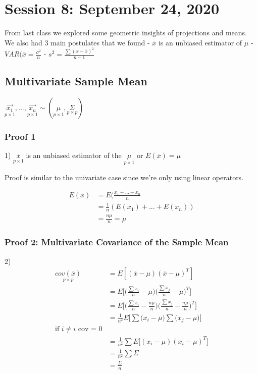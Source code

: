 \chapter{Session 8: September 24, 2020}
\label{eight}
From last class we explored some geometric insights of projections and means. We also had 3 main postulates that we found 
- $\overline{x}$ is an unbiased estimator of $\mu$
- $VAR(\overline{x} = \frac{\sigma^2}{n}$
- $s^2 = \frac{\sum (x-\overline{x})^2}{n-1}$

\section{Multivariate Sample Mean}
$\underset{p \times 1}{\vec{x_1}}, ..., \underset{p \times 1}{\vec{x_n}} \sim (\underset{p \times 1}{\mu},\underset{p \times p}{\Sigma})$
\subsection{Proof 1}
1) $\underset{p \times 1}{\overline{x}}$ is an unbiased estimator of the $\underset{p\times 1}{\mu}$ or
$E(\overline{x}) = \mu$

Proof is similar to the univariate case since we're only using linear operators.


\begin{align*}
    E(\overline{x}) &= E(\frac{x_1 + ... + x_n}{n} \\
    &= \frac{1}{n}(E(x_1)+...+E(x_n)) \\
    &= \frac{n\mu}{n} = \mu
\end{align*}

\subsection{Proof 2: Multivariate Covariance of the Sample Mean}

2) 
\begin{align*}
    \underset{p \times p}{cov(\overline{x})} &= E[(\overline{x}-\mu)(\overline{x}-\mu)^T] \\
    &= E \Big[\Big(\frac{\sum x_i}{n}-\mu \Big) \Big(\frac{\sum x_j}{n}-\mu \Big)^T \Big] \\
    &= E \Big[ \Big(\frac{\sum x_i}{n}-\frac{n\mu}{n} \Big) \Big( \frac{\sum x_j}{n}-\frac{n\mu}{n} \Big)^T \Big] \\
    &=\frac{1}{n^2}E \Big[ \sum \Big(x_i -\mu \Big) \sum \Big(x_j -\mu \Big)  \Big] \\
    \text{if $i\neq i$ cov = 0} \\
    &= \frac{1}{n^2}\sum E\big[(x_i-\mu)(x_i-\mu)^T \big]\\
    &= \frac{1}{n^2}\sum \Sigma\\
    &= \frac{\Sigma}{n}
\end{align*}

